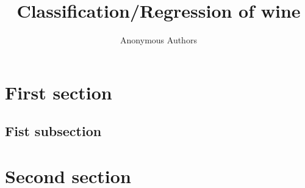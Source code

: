 \documentclass[twocolumn]{scrartcl}
\title{Classification/Regression of wine}
\author{Anonymous Authors}
\begin{document}
\maketitle

\section{First section}

\subsection{Fist subsection}

\section{Second section}


\end{document}
